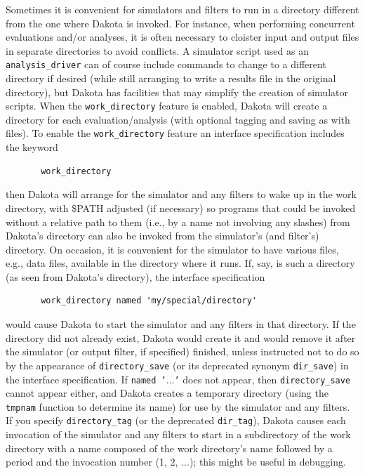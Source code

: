 Sometimes it is convenient for simulators and filters to run in a
directory different from the one where Dakota is invoked.  For instance,
when performing concurrent evaluations and/or analyses, it is often
necessary to cloister input and output files in separate directories to
avoid conflicts.  A simulator script used as an \texttt{analysis\_driver}
can of course include commands to change to a different directory if
desired (while still arranging to write a results file in the original
directory), but Dakota has facilities that may simplify the creation of
simulator scripts.  When the \texttt{work\_directory} feature is enabled,
Dakota will create a directory for each evaluation/analysis (with
optional tagging and saving as with files).  To enable the
\texttt{work\_directory} feature an interface specification includes
the keyword
\begin{small}
\begin{verbatim}
       work_directory
\end{verbatim}
\end{small}
then Dakota will arrange for the simulator and any filters to
wake up in the work directory, with \$PATH adjusted (if necessary)
so programs that could be invoked without a relative
path to them (i.e., by a name not involving any slashes) from
Dakota's directory can also be invoked from the simulator's (and filter's)
directory.  On occasion, it is convenient for the simulator to have
various files, e.g., data files, available in the directory where it
runs.  If, say,  is such a directory
(as seen from Dakota's directory), the interface specification
\begin{small}
\begin{verbatim}
       work_directory named 'my/special/directory'
\end{verbatim}
\end{small}
would cause Dakota to start the simulator and any filters in that
directory.  If the directory did not already exist, Dakota would
create it and would remove it after the simulator (or output filter,
if specified) finished, unless instructed not to do so by the
appearance of \texttt{directory\_save} (or its deprecated synonym
\texttt{dir\_save}) in the interface specification.  If \texttt{named
  '$...$'} does not appear, then \texttt{directory\_save} cannot
appear either, and Dakota creates a temporary directory (using the
\texttt{tmpnam} function to determine its name) for use by the
simulator and any filters.  If you specify \texttt{directory\_tag} (or
the deprecated \texttt{dir\_tag}), Dakota causes each invocation of
the simulator and any filters to start in a subdirectory of the work
directory with a name composed of the work directory's name followed
by a period and the invocation number (1, 2, $...$); this might be
useful in debugging.

